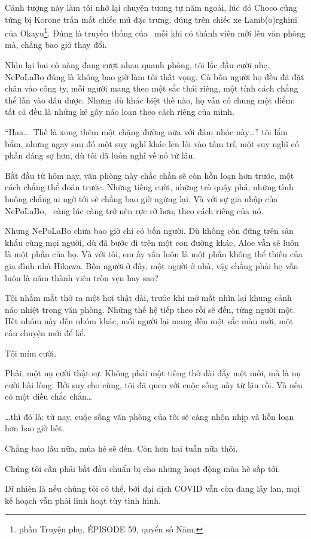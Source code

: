 \documentclass[../main.tex]{subfiles}
\begin{document}
Cảnh tượng này làm tôi nhớ lại chuyện tương tự năm ngoái, lúc đó Choco cũng từng bị Korone trấn mất chiếc mũ đặc trưng, đúng trên chiếc xe Lamb(o)rghini của Okayu\footnote{phần {\abv Truyện phụ}, {\flaregothic ÉPISODE 59}, quyển số Năm.}. Đúng là truyền thống của \hll\ mỗi khi có thành viên mới lên văn phòng mà, chẳng bao giờ thay đổi.

Nhìn lại hai cô nàng đang rượt nhau quanh phòng, tôi lắc đầu cười nhẹ. NePoLaBo đúng là không bao giờ làm tôi thất vọng. Cả bốn người họ đều đã đặt chân vào công ty, mỗi người mang theo một sắc thái riêng, một tính cách chẳng thể lẫn vào đâu được. Nhưng dù khác biệt thế nào, họ vẫn có chung một điểm: tất cả đều là những kẻ gây náo loạn theo cách riêng của mình.

``Haa\dots\ Thế là xong thêm một chặng đường nữa với đám nhóc này\dots'' tôi lẩm bẩm, nhưng ngay sau đó một suy nghĩ khác len lỏi vào tâm trí; một suy nghĩ có phần đáng sợ hơn, dù tôi đã luôn nghĩ về nó từ lâu.

Bắt đầu từ hôm nay, văn phòng này chắc chắn sẽ còn hỗn loạn hơn trước, một cách chẳng thể đoán trước. Những tiếng cười, những trò quậy phá, những tình huống chẳng ai ngờ tới sẽ chẳng bao giờ ngừng lại. Và với sự gia nhập của NePoLaBo, \hll\ càng lúc càng trở nên rực rỡ hơn, theo cách riêng của nó.

Nhưng NePoLaBo chưa bao giờ chỉ có bốn người. Dù không còn đứng trên sân khấu cùng mọi người, dù đã bước đi trên một con đường khác, Aloe vẫn sẽ luôn là một phần của họ. Và với tôi, em ấy vẫn luôn là một phần không thể thiếu của gia đình nhà Hikawa. Bốn người ở đây, một người ở nhà, vậy chẳng phải họ vẫn luôn là năm thành viên tròn vẹn hay sao?

Tôi nhắm mắt thở ra một hơi thật dài, trước khi mở mắt nhìn lại khung cảnh náo nhiệt trong văn phòng. Những thế hệ tiếp theo rồi sẽ đến, từng người một. Hết nhóm này đến nhóm khác, mỗi người lại mang đến một sắc màu mới, một câu chuyện mới để kể.

Tôi mỉm cười.

Phải, một nụ cười thật sự. Không phải một tiếng thở dài đầy mệt mỏi, mà là nụ cười hài lòng. Bởi suy cho cùng, tôi đã quen với cuộc sống này từ lâu rồi. Và nếu có một điều chắc chắn\dots

\dots thì đó là: từ nay, cuộc sống văn phòng của tôi sẽ càng nhộn nhịp và hỗn loạn hơn bao giờ hết.

Chẳng bao lâu nữa, mùa hè sẽ đến. Còn hơn hai tuần nữa thôi.

Chúng tôi cần phải bắt đầu chuẩn bị cho những hoạt động mùa hè sắp tới.

Dĩ nhiên là nếu chúng tôi có thể, bởi đại dịch COVID vẫn còn đang lây lan, mọi kế hoạch vẫn phải linh hoạt tùy tình hình.
\end{document}
